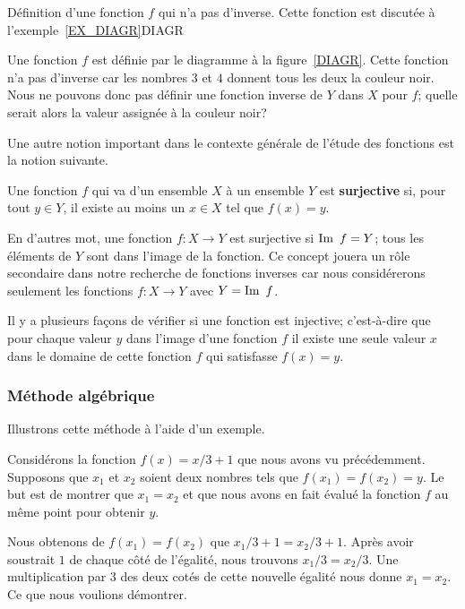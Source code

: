 {
{Définition d'une fonction $f$ qui n'a pas d'inverse.  Cette fonction
est discutée à l'exemple~\ref{EX_DIAGR}}{DIAGR}

\begin{egg}
Une fonction $f$ est définie par le diagramme à la
figure~\ref{DIAGR}.  Cette fonction n'a pas d'inverse car les nombres
$3$ et $4$ donnent tous les deux la couleur noir.  Nous ne pouvons
donc pas définir une fonction inverse de $Y$ dans $X$ pour $f$; quelle
serait alors la valeur assignée à la couleur noir?
\label{EX_DIAGR}
\end{egg}

Une autre notion important dans le contexte générale de l'étude des
fonctions est la notion suivante.

\begin{defn} 
Une fonction $f$ qui va d'un ensemble $X$ à un ensemble $Y$ est
{\bfseries surjective} si, pour tout
$y \in Y$, il existe au moins un $x \in X$ tel que $f(x) = y$.
\end{defn}

En d'autres mot, une fonction $f: X \to Y$ est surjective si
$\IM f = Y$; tous les éléments de $Y$ sont dans l'image de la fonction.
Ce concept jouera un rôle secondaire dans notre recherche de
fonctions inverses car nous considérerons seulement les fonctions
$f : X \to Y$ avec $Y = \IM f$.

Il y a plusieurs façons de vérifier si une fonction est injective;
c'est-à-dire que pour chaque valeur $y$ dans l'image d'une fonction
$f$ il existe une seule valeur $x$ dans le domaine de cette fonction
$f$ qui satisfasse $f(x) = y$.

\subsubsection{Méthode algébrique}

Illustrons cette méthode à l'aide d'un exemple.

\begin{egg}
Considérons la fonction $f(x) = x/3 +1$ que nous avons vu précédemment.
Supposons que $x_1$ et $x_2$ soient deux nombres tels que
$f(x_1) = f(x_2) = y$.  Le but est de montrer que $x_1 = x_2$ et que
nous avons en fait évalué la fonction $f$ au même point pour obtenir
$y$.

Nous obtenons de $f(x_1) = f(x_2)$ que $x_1/3  + 1 = x_2/3 +1$.
Après avoir soustrait $1$ de chaque côté de l'égalité, nous trouvons
$x_1/3 = x_2/3$.  Une multiplication par $3$ des deux cotés de cette
nouvelle égalité nous donne $x_1 = x_2$.  Ce que nous voulions
démontrer.
\end{egg}

}
